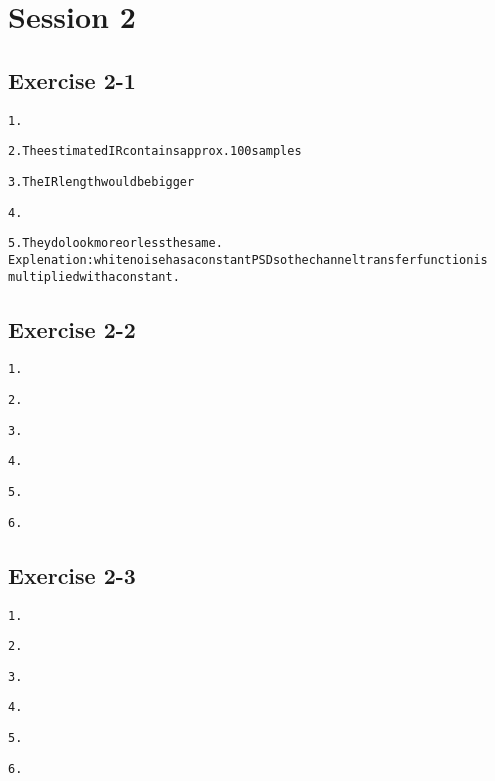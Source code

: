 \documentclass[a4paper,11pt]{article}
\begin{document}
\section{Session 2}
\subsection{Exercise 2-1}
\begin{alltt}
1.	

2.	The estimated IR contains approx. 100 samples

3.	The IR length would be bigger

4.	

5.	They do look more or less the same.
	Explenation: white noise has a constant PSD so the channel transferfunction is
	multiplied with a constant.

\end{alltt}
\subsection{Exercise 2-2}
\begin{alltt}
1.



2.	

3.

4.

5.

6.
\end{alltt}
\subsection{Exercise 2-3}
\begin{alltt}
1.

2.	

3.

4.

5.

6.
\end{alltt}
\end{document}
